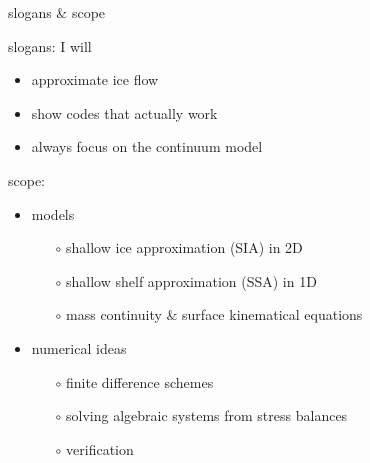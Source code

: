 
\begin{frame}{slogans \& scope}

slogans: I will
  \begin{itemize}
  \item \alert{approximate ice flow}
  \item \alert{show codes that actually work}
  \item \alert{always focus on the continuum model}
  \end{itemize}
\medskip

scope:
  \begin{itemize}
  \item models

    \begin{itemize}
    \item[$\circ$] shallow ice approximation (SIA) in 2D
    \item[$\circ$] shallow shelf approximation (SSA) in 1D 
    \item[$\circ$] mass continuity \& surface kinematical equations
    \end{itemize}

  \item numerical ideas

    \begin{itemize}
    \item[$\circ$] finite difference schemes
    \item[$\circ$] solving algebraic systems from stress balances
    \item[$\circ$] verification
    \end{itemize}
  \end{itemize}
\end{frame}


\begin{comment}
\begin{frame}{outside of scope}

\large\emph{not} \normalsize covered here:\normalsize
\medskip

  \begin{itemize}
  \item Stokes and ``higher order'' flow equations
  \item thermomechanical coupling or polythermal ice
  \item subglacial hydrology/processes
  \item mass balance and snow/firn processes
  \item constitutive relations other than Glen isotropic
  \item grounding lines, calving fronts, ocean interaction
  \item paleo-climate and ``spin-up''
  \item earth deformation under ice sheet load
  \item other numerics: FEM, spectral, multigrid, parallel, \dots
  \item etc.
  \end{itemize}

\end{frame}
\end{comment}

